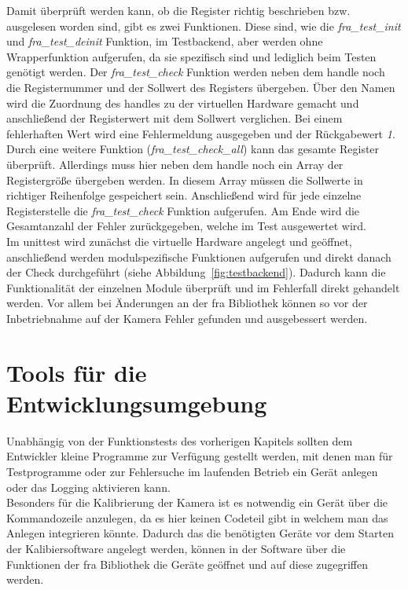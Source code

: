 Damit überprüft werden kann, ob die Register richtig beschrieben bzw. ausgelesen worden sind, gibt es zwei Funktionen. Diese sind, wie die \textit{fra\_test\_init} und \textit{fra\_test\_deinit} Funktion, im Testbackend, aber werden ohne Wrapperfunktion aufgerufen, da sie spezifisch sind und lediglich beim Testen genötigt werden.
Der \textit{fra\_test\_check} Funktion werden neben dem \gls{handle} noch die Registernummer und der Sollwert des Registers übergeben. Über den Namen wird die Zuordnung des \glspl{handle} zu der virtuellen Hardware gemacht und anschließend der Registerwert mit dem Sollwert verglichen. Bei einem fehlerhaften Wert wird eine Fehlermeldung ausgegeben und der Rückgabewert \textit{1}.
Durch eine weitere Funktion (\textit{fra\_test\_check\_all}) kann das gesamte Register überprüft. Allerdings muss hier neben dem \gls{handle} noch ein Array der Registergröße übergeben werden. In diesem Array müssen die Sollwerte in richtiger Reihenfolge gespeichert sein. Anschließend wird für jede einzelne Registerstelle die \textit{fra\_test\_check} Funktion aufgerufen. Am Ende wird die Gesamtanzahl der Fehler zurückgegeben, welche im Test ausgewertet wird.\\


Im \gls{unittest} wird zunächst die virtuelle Hardware angelegt und geöffnet, anschließend werden modulspezifische Funktionen aufgerufen und direkt danach der Check durchgeführt (siehe Abbildung~\ref{fig:testbackend}). Dadurch kann die Funktionalität der einzelnen Module überprüft und im Fehlerfall direkt gehandelt werden. Vor allem bei Änderungen an der \ac{fra} Bibliothek können so vor der Inbetriebnahme auf der Kamera Fehler gefunden und ausgebessert werden.


\section{Tools für die Entwicklungsumgebung}
Unabhängig von der Funktionstests des vorherigen Kapitels sollten dem Entwickler kleine Programme zur Verfügung gestellt werden, mit denen man für Testprogramme oder zur Fehlersuche im laufenden Betrieb ein Gerät anlegen oder das Logging aktivieren kann.\\


Besonders für die Kalibrierung der Kamera ist es notwendig ein Gerät über die Kommandozeile anzulegen, da es hier keinen Codeteil gibt in welchem man das Anlegen integrieren könnte. Dadurch das die benötigten Geräte vor dem Starten der Kalibiersoftware angelegt werden, können in der Software über die Funktionen der \ac{fra} Bibliothek die Geräte geöffnet und auf diese zugegriffen werden.


